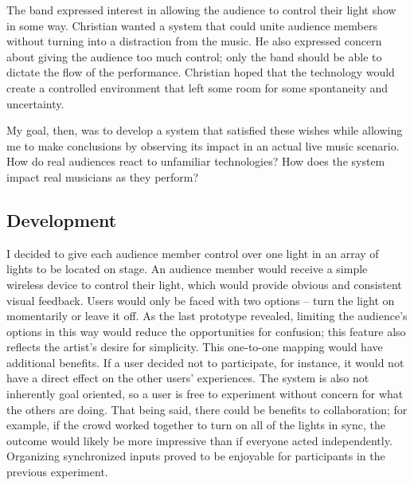 The band expressed interest in allowing the audience to control their light show in some way. Christian wanted a system that could unite audience members without turning into a distraction from the music. He also expressed concern about giving the audience too much control; only the band should be able to dictate the flow of the performance. Christian hoped that the technology would create a controlled environment that left some room for some spontaneity and uncertainty.

My goal, then, was to develop a system that satisfied these wishes while allowing me to make conclusions by observing its impact in an actual live music scenario. How do real audiences react to unfamiliar technologies? How does the system impact real musicians as they perform?


\subsection{Development}

I decided to give each audience member control over one light in an array of lights to be located on stage. An audience member would receive a simple wireless device to control their light, which would provide obvious and consistent visual feedback. Users would only be faced with two options -- turn the light on momentarily or leave it off. As the last prototype revealed, limiting the audience's options in this way would reduce the opportunities for confusion; this feature also reflects the artist's desire for simplicity. This one-to-one mapping would have additional benefits. If a user decided not to participate, for instance, it would not have a direct effect on the other users' experiences. The system is also not inherently goal oriented, so a user is free to experiment without concern for what the others are doing. That being said, there could be benefits to collaboration; for example, if the crowd worked together to turn on all of the lights in sync, the outcome would likely be more impressive than if everyone acted independently. Organizing synchronized inputs proved to be enjoyable for participants in the previous experiment.


